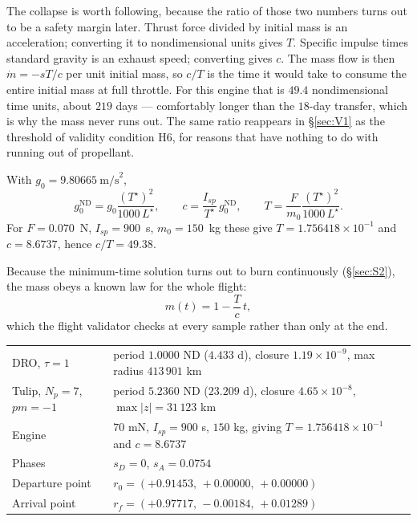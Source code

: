 \documentclass[11pt]{article}
\newcommand{\ND}{\mathrm{ND}}
\begin{document}
\begin{intu}
The collapse is worth following, because the ratio of those two numbers turns
out to be a safety margin later. Thrust force divided by initial mass is an
acceleration; converting it to nondimensional units gives $T$. Specific impulse
times standard gravity is an exhaust speed; converting gives $c$. The mass
flow is then $\dot m = -sT/c$ per unit initial mass, so $c/T$ is the time it
would take to consume the entire initial mass at full throttle. For this engine
that is $49.4$ nondimensional time units, about $219$ days --- comfortably
longer than the $18$-day transfer, which is why the mass never runs out. The
same ratio reappears in \S\ref{sec:V1} as the threshold of validity condition
H6, for reasons that have nothing to do with running out of propellant.
\end{intu}

\begin{rig}
With $g_0 = 9.80665~\text{m/s}^2$,
\begin{equation}\label{eq:nd}
g_0^{\ND} = g_0 \frac{(T^\star)^2}{1000\,L^\star}, \qquad
c = \frac{I_{sp}}{T^\star} \, g_0^{\ND}, \qquad
T = \frac{F}{m_0} \frac{(T^\star)^2}{1000\, L^\star}.
\end{equation}
For $F = 0.070$~N, $I_{sp} = 900$~s, $m_0 = 150$~kg these give
$T = 1.756418 \times 10^{-1}$ and $c = 8.6737$, hence $c/T = 49.38$.

Because the minimum-time solution turns out to burn continuously
(\S\ref{sec:S2}), the mass obeys a known law for the whole flight:
\begin{equation}\label{eq:masslaw}
m(t) = 1 - \frac{T}{c}\, t,
\end{equation}
which the flight validator checks at every sample rather than only at the end.
\end{rig}

\begin{ran}
\begin{tabular}{@{}lp{}@{}}
\toprule
DRO, $\tau = 1$ & period $1.0000$ ND ($4.433$ d), closure $1.19\times10^{-9}$,
  max radius $413\,901$ km\\
Tulip, $N_p = 7$, $pm = -1$ & period $5.2360$ ND ($23.209$ d), closure
  $4.65\times10^{-8}$, $\max|z| = 31\,123$ km\\
Engine & $70$ mN, $I_{sp} = 900$ s, $150$ kg, giving
  $T = 1.756418\times10^{-1}$ and $c = 8.6737$\\
Phases & $s_D = 0$, $s_A = 0.0754$\\
Departure point & $r_0 = (+0.91453,\, +0.00000,\, +0.00000)$\\
Arrival point & $r_f = (+0.97717,\, -0.00184,\, +0.01289)$\\
\bottomrule
\end{tabular}
\end{ran}
\end{document}
